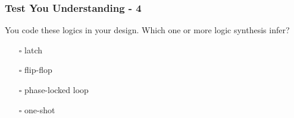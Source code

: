 \documentclass[t, notes, xcolor=table]{beamer}
\begin{document}
\begin{frame}
\frametitle{Test You Understanding - 4}
You code these logics in your design. Which one or more logic synthesis infer?
\begin{itemize}
\item[$\square$] latch
\item[$\square$] flip-flop
\item[$\square$] phase-locked loop
\item[$\square$] one-shot
\end{itemize}
\end{frame}
\end{document}
